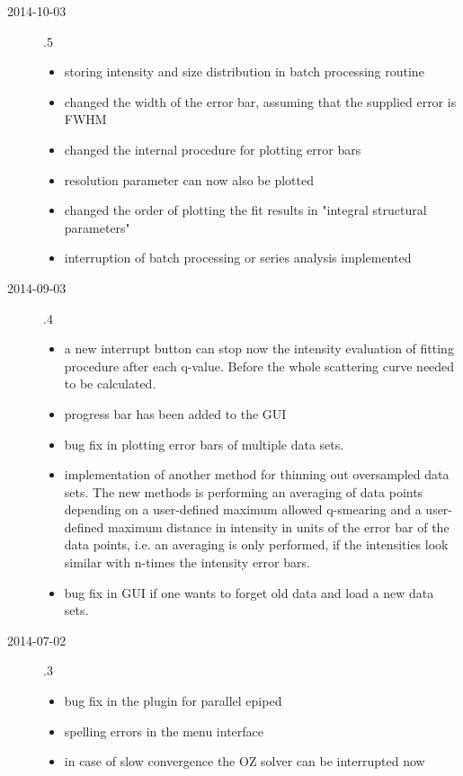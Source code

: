 \begin{description}
\begin{itemize}
    \end{itemize}
\item[2014-10-03] .5
    \begin{itemize}
        \item storing intensity and size distribution in batch processing routine
        \item changed the width of the error bar, assuming that the supplied error is FWHM
        \item changed the internal procedure for plotting error bars
        \item resolution parameter can now also be plotted
        \item changed the order of plotting the fit results
            in "integral structural parameters"
        \item interruption of batch processing or series analysis implemented
    \end{itemize}
\item[2014-09-03] .4
    \begin{itemize}
    \item a new interrupt button can stop now the intensity evaluation of fitting
        procedure after each q-value. Before the whole scattering curve needed to be
        calculated.
    \item progress bar has been added to the GUI
    \item bug fix in plotting error bars of multiple data sets.
    \item implementation of another method for thinning out oversampled data sets. The
        new methods is performing an averaging of data points depending on a
        user-defined maximum allowed q-smearing and a user-defined maximum distance
        in intensity in units of the error bar of the data points, i.e. an averaging is
        only performed, if the intensities look similar with n-times the intensity
        error bars.
    \item bug fix in GUI if one wants to forget old data and load a new data sets.
    \end{itemize}
    \item[2014-07-02] .3
    \begin{itemize}
        \item bug fix in the plugin for parallel epiped
        \item spelling errors in the menu interface
        \item in case of slow convergence the OZ solver can be interrupted now

\end{itemize}
\end{description}
